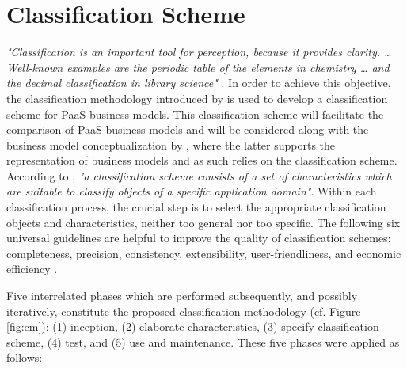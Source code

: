\section{Classification Scheme}\label{ch:sota:cm}

\textit{"Classification is an important tool for perception, because it provides clarity. \ldots\xspace Well-known examples are the periodic table of the elements in chemistry \ldots\xspace and the decimal classification in library science"} \citep[p. 36]{Fettke2003}. In order to achieve this objective, the classification methodology introduced by \citet{Fettke2003} is used to develop a classification scheme for \ac{PaaS} business models. This classification scheme will facilitate the comparison of \ac{PaaS} business models and will be considered along with the business model conceptualization by \citet{Johnson2008}, where the latter supports the representation of business models and as such relies on the classification scheme. According to \citet[p. 39]{Fettke2003}, \textit{"a classification scheme consists of a set of characteristics which are suitable to classify objects of a specific application domain"}. Within each classification process, the crucial step is to select the appropriate classification objects and characteristics, neither too general nor too specific. The following six universal guidelines are helpful to improve the quality of classification schemes: completeness, precision, consistency, extensibility, user-friendliness, and economic efficiency \citep[pp. 40-41]{Fettke2003}. 

Five interrelated phases which are performed subsequently, and possibly iteratively, constitute the proposed classification methodology (cf. Figure \ref{fig:cm}): (1) inception, (2) elaborate characteristics, (3) specify classification scheme, (4) test, and (5) use and maintenance. These five phases were applied as follows:

